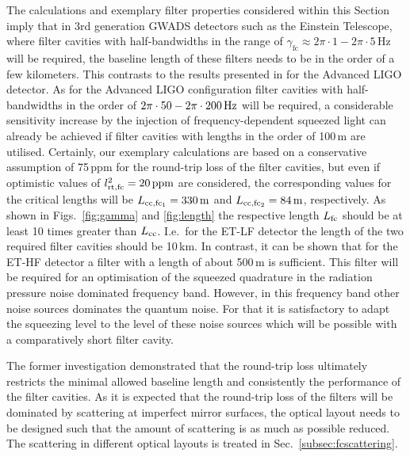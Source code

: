 The calculations and exemplary filter properties considered within
this Section imply that in 3rd generation GWADS
detectors such as the Einstein Telescope, where filter cavities with half-bandwidths
in the range of ${\gamma_\text{fc}\approx 2\pi\cdot1- 2\pi\cdot5\,\mathrm{Hz}}$ will be
required, the baseline length of these filters needs to be in the
order of a few kilometers. This contrasts to the results presented
in \cite{Khalili2009} for the Advanced LIGO
detector. As for the Advanced LIGO configuration filter cavities with
half-bandwidths in the order of ${2\pi\cdot50- 2\pi\cdot200\,{\rm Hz}}$ will be required, a
considerable sensitivity increase by the injection of frequency-dependent squeezed light can already be achieved if filter
cavities with lengths in the order of 100\,m are utilised. Certainly,
our exemplary calculations are based on a conservative assumption
of 75\,ppm for the round-trip loss of the filter cavities, but
even if optimistic values of $l_{\rm rt,fc}^2=20\,\mathrm{ppm}$ are
considered, the corresponding values for the critical lengths will
be $L_{\rm cc, fc_1} = 330\,{\rm m}$ and  $L_{\rm cc, fc_2} =
84\,{\rm m}$, respectively. As shown in Figs.~\ref{fig:gamma}
and \ref{fig:length} the respective length $L_{\rm fc}$ should be
at least 10 times greater than $L_{\rm cc}$.   I.e.\ for the ET-LF detector the  length of the two required filter cavities should be 10\,km. In contrast, it can be shown that for the ET-HF detector a filter with a length of about 500\,m is sufficient. This filter will be required for an optimisation of the squeezed quadrature in the radiation pressure noise dominated frequency band. However, in this frequency band other noise sources dominates the quantum noise. For that it is satisfactory to adapt the squeezing level to the level of these noise sources which will be possible with a comparatively short filter cavity.



The former investigation demonstrated that  the round-trip loss ultimately restricts the minimal allowed baseline length and consistently the performance of the filter cavities. As it is expected that the round-trip loss of the filters will be dominated by scattering at imperfect mirror surfaces, the optical layout needs to be designed such that the amount of scattering is as much as possible reduced. The scattering in different optical layouts is treated in Sec.~\ref{subsec:fcscattering}.

